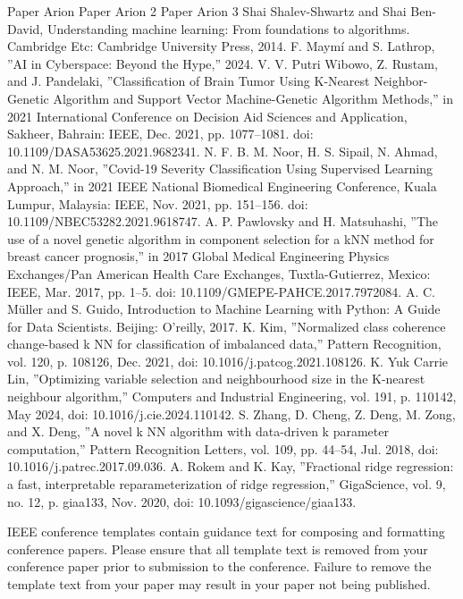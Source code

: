 \documentclass[conference]{IEEEtran}
\begin{document}
\begin{thebibliography}{00}
 Paper Arion
 Paper Arion 2
 Paper Arion 3
 Shai Shalev-Shwartz and Shai Ben-David, Understanding machine learning: From foundations to algorithms. Cambridge Etc: Cambridge University Press, 2014.
 F. Maymí and S. Lathrop, ''AI in Cyberspace: Beyond the Hype,'' 2024.
 V. V. Putri Wibowo, Z. Rustam, and J. Pandelaki, ''Classification of Brain Tumor Using K-Nearest Neighbor-Genetic Algorithm and Support Vector Machine-Genetic Algorithm Methods,'' in 2021 International Conference on Decision Aid Sciences and Application, Sakheer, Bahrain: IEEE, Dec. 2021, pp. 1077--1081. doi: 10.1109/DASA53625.2021.9682341.
 N. F. B. M. Noor, H. S. Sipail, N. Ahmad, and N. M. Noor, ''Covid-19 Severity Classification Using Supervised Learning Approach,'' in 2021 IEEE National Biomedical Engineering Conference, Kuala Lumpur, Malaysia: IEEE, Nov. 2021, pp. 151--156. doi: 10.1109/NBEC53282.2021.9618747.
 A. P. Pawlovsky and H. Matsuhashi, ''The use of a novel genetic algorithm in component selection for a kNN method for breast cancer prognosis,'' in 2017 Global Medical Engineering Physics Exchanges/Pan American Health Care Exchanges, Tuxtla-Gutierrez, Mexico: IEEE, Mar. 2017, pp. 1--5. doi: 10.1109/GMEPE-PAHCE.2017.7972084.
 A. C. Müller and S. Guido, Introduction to Machine Learning with Python: A Guide for Data Scientists. Beijing: O'reilly, 2017.
 K. Kim, ''Normalized class coherence change-based k NN for classification of imbalanced data,'' Pattern Recognition, vol. 120, p. 108126, Dec. 2021, doi: 10.1016/j.patcog.2021.108126.
 K. Yuk Carrie Lin, ''Optimizing variable selection and neighbourhood size in the K-nearest neighbour algorithm,'' Computers and Industrial Engineering, vol. 191, p. 110142, May 2024, doi: 10.1016/j.cie.2024.110142.
 S. Zhang, D. Cheng, Z. Deng, M. Zong, and X. Deng, ''A novel k NN algorithm with data-driven k parameter computation,'' Pattern Recognition Letters, vol. 109, pp. 44--54, Jul. 2018, doi: 10.1016/j.patrec.2017.09.036.
 A. Rokem and K. Kay, ''Fractional ridge regression: a fast, interpretable reparameterization of ridge regression,'' GigaScience, vol. 9, no. 12, p. giaa133, Nov. 2020, doi: 10.1093/gigascience/giaa133.
\end{thebibliography}
\vspace{12pt}
\color{red}
IEEE conference templates contain guidance text for composing and formatting conference papers. Please ensure that all template text is removed from your conference paper prior to submission to the conference. Failure to remove the template text from your paper may result in your paper not being published.
\end{document}
